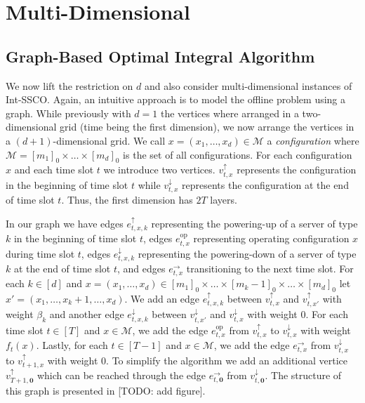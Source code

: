 \section{Multi-Dimensional}

\subsection{Graph-Based Optimal Integral Algorithm}

We now lift the restriction on $d$ and also consider multi-dimensional instances of Int-SSCO. Again, an intuitive approach is to model the offline problem using a graph. While previously with $d = 1$ the vertices where arranged in a two-dimensional grid (time being the first dimension), we now arrange the vertices in a $(d+1)$-dimensional grid. We call $x = (x_1, \dots, x_d) \in \mathcal{M}$ a \textit{configuration} where $\mathcal{M} = [m_1]_0 \times \dots \times [m_d]_0$ is the set of all configurations. For each configuration $x$ and each time slot $t$ we introduce two vertices. $v_{t,x}^{\uparrow}$ represents the configuration in the beginning of time slot $t$ while $v_{t,x}^{\downarrow}$ represents the configuration at the end of time slot $t$. Thus, the first dimension has $2 T$ layers.

In our graph we have edges $e_{t,x,k}^{\uparrow}$ representing the powering-up of a server of type $k$ in the beginning of time slot $t$, edges $e_{t,x}^{\text{op}}$ representing operating configuration $x$ during time slot $t$, edges $e_{t,x,k}^{\downarrow}$ representing the powering-down of a server of type $k$ at the end of time slot $t$, and edges $e_{t,x}^{\rightarrow}$ transitioning to the next time slot. For each $k \in [d]$ and $x = (x_1, \dots, x_d) \in [m_1]_0 \times \dots \times [m_k - 1]_0 \times \dots \times [m_d]_0$ let $x' = (x_1, \dots, x_k + 1, \dots, x_d)$. We add an edge $e_{t,x,k}^{\uparrow}$ between $v_{t,x}^{\uparrow}$ and $v_{t,x'}^{\uparrow}$ with weight $\beta_k$ and another edge $e_{t,x,k}^{\downarrow}$ between $v_{t,x'}^{\downarrow}$ and $v_{t,x}^{\downarrow}$ with weight $0$. For each time slot $t \in [T]$ and $x \in \mathcal{M}$, we add the edge $e_{t,x}^{\text{op}}$ from $v_{t,x}^{\uparrow}$ to $v_{t,x}^{\downarrow}$ with weight $f_t(x)$. Lastly, for each $t \in [T-1]$ and $x \in \mathcal{M}$, we add the edge $e_{t,x}^{\rightarrow}$ from $v_{t,x}^{\downarrow}$ to $v_{t+1,x}^{\uparrow}$ with weight $0$.  To simplify the algorithm we add an additional vertice $v_{T+1,\mathbf{0}}^{\uparrow}$ which can be reached through the edge $e_{t,\mathbf{0}}^{\rightarrow}$ from $v_{t,\mathbf{0}}^{\downarrow}$. The structure of this graph is presented in [TODO: add figure].

